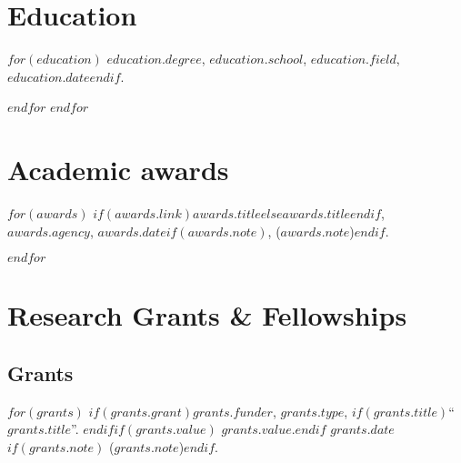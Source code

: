 \documentclass[11pt]{article}
\title{}
\def\printdate#1{\xprintdate#1-}
\def\xprintdate#1-#2-#3-{#1}
\def\daterange#1#2{\xprintdate#1---\xprintdate#2-}
\begin{document}
\maketitle

\section{Education}

$for(education)$
\ind $education.degree$, \textbf{$education.school$}, $education.field$, \printdate{$education.date$}$if(education.info)$ ($education.info$)
$else$

$endif$
$endfor$

\section{Appointments}

$for(appointment)$
\subsection{$appointment.place$}
$for(appointment.items)$
\ind $appointment.items.item$. $if(appointment.items.enddate)$\daterange{$appointment.items.begindate$}{$appointment.items.enddate$}$else$\printdate{$appointment.items.begindate$}--$endif$.

$endfor$
$endfor$

\section{Academic awards}

$for(awards)$
\ind \textit{$if(awards.link)$\href{$awards.link$}{$awards.title$}$else$$awards.title$$endif$}, $awards.agency$, $awards.date$$if(awards.note)$, ($awards.note$)$endif$.

$endfor$

\section{Research Grants \& Fellowships}

\subsection{Grants}
$for(grants)$
$if(grants.grant)$\ind \textit{$grants.funder$}, $grants.type$, $if(grants.title)$``$grants.title$''. $endif$$if(grants.value)$ $grants.value$.$endif$ $grants.date$$if(grants.note)$ ($grants.note$)$endif$.
\end{document}
